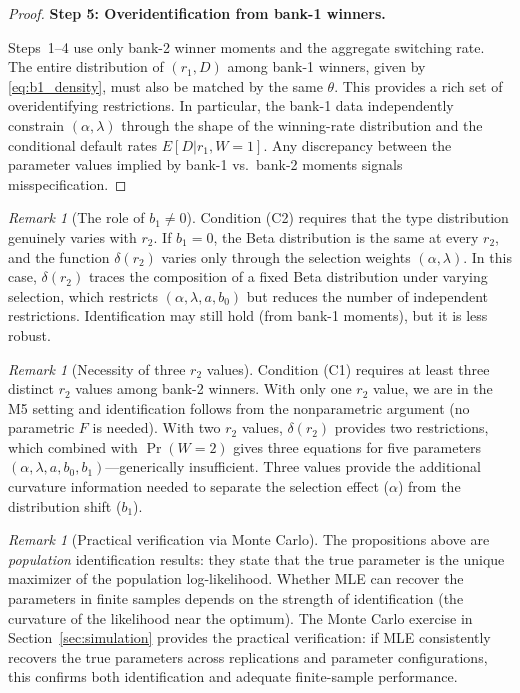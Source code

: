 \documentclass[12pt]{article}
\theoremstyle{plain}
\theoremstyle{plain}
\theoremstyle{definition}  %
\theoremstyle{remark}  %
\newtheorem{remark}[thm]{Remark}  %
\begin{document}
\begin{proof}
\medskip\noindent
\textbf{Step 5: Overidentification from bank-1 winners.}

Steps~1--4 use only bank-2 winner moments and the aggregate switching rate.  The entire distribution of $(r_1, D)$ among bank-1 winners, given by \eqref{eq:b1_density}, must also be matched by the same $\theta$.  This provides a rich set of overidentifying restrictions.  In particular, the bank-1 data independently constrain $(\alpha, \lambda)$ through the shape of the winning-rate distribution and the conditional default rates $E[D|r_1, W\!=\!1]$.  Any discrepancy between the parameter values implied by bank-1 vs.\ bank-2 moments signals misspecification.
\end{proof}

\begin{remark}[The role of $b_1 \neq 0$]\label{rem:b1}
Condition (C2) requires that the type distribution genuinely varies with $r_2$.  If $b_1 = 0$, the Beta distribution is the same at every $r_2$, and the function $\delta(r_2)$ varies only through the selection weights $(\alpha, \lambda)$.  In this case, $\delta(r_2)$ traces the composition of a fixed Beta distribution under varying selection, which restricts $(\alpha, \lambda, a, b_0)$ but reduces the number of independent restrictions.  Identification may still hold (from bank-1 moments), but it is less robust.
\end{remark}

\begin{remark}[Necessity of three $r_2$ values]\label{rem:three_r2}
Condition (C1) requires at least three distinct $r_2$ values among bank-2 winners.  With only one $r_2$ value, we are in the M5 setting and identification follows from the nonparametric argument (no parametric $F$ is needed).  With two $r_2$ values, $\delta(r_2)$ provides two restrictions, which combined with $\Pr(W\!=\!2)$ gives three equations for five parameters $(\alpha, \lambda, a, b_0, b_1)$---generically insufficient.  Three values provide the additional curvature information needed to separate the selection effect ($\alpha$) from the distribution shift ($b_1$).
\end{remark}

\begin{remark}[Practical verification via Monte Carlo]\label{rem:monte_carlo}
The propositions above are \emph{population} identification results: they state that the true parameter is the unique maximizer of the population log-likelihood.  Whether MLE can recover the parameters in finite samples depends on the strength of identification (the curvature of the likelihood near the optimum).  The Monte Carlo exercise in Section~\ref{sec:simulation} provides the practical verification: if MLE consistently recovers the true parameters across replications and parameter configurations, this confirms both identification and adequate finite-sample performance.
\end{remark}
\end{document}
